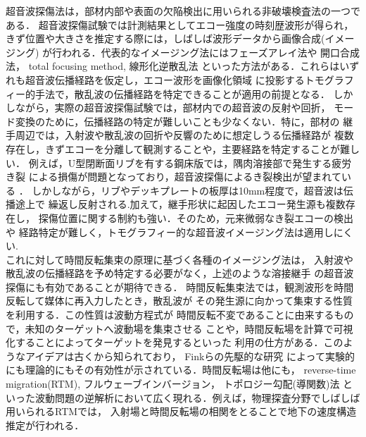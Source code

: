 ﻿超音波探傷法は，部材内部や表面の欠陥検出に用いられる非破壊検査法の一つである．
超音波探傷試験では計測結果としてエコー強度の時刻歴波形が得られ，
きず位置や大きさを推定する際には，しばしば波形データから画像合成(イメージング)
が行われる．代表的なイメージング法にはフェーズアレイ法\cite{Wilcox2007}や
開口合成法\cite{Thomson1984, Doctor1986,Langenberg1986, Schmitz2000,Spies2012}，
total focusing method\cite{Holmes2008, Zhang2010}, 
線形化逆散乱法\cite{Langenberg1989, Kitahara2002, Shlivinski2007}
といった方法がある．これらはいずれも超音波伝播経路を仮定し，エコー波形を画像化領域
に投影するトモグラフィー的手法で，散乱波の伝播経路を特定できることが適用の前提となる．
%
しかしながら，実際の超音波探傷試験では，部材内での超音波の反射や回折，
モード変換のために，伝播経路の特定が難しいことも少なくない．特に，部材の
継手周辺では，入射波や散乱波の回折や反響のために想定しうる伝播経路が
複数存在し，きずエコーを分離して観測することや，主要経路を特定することが難しい．
例えば，U型閉断面リブを有する鋼床版では，隅肉溶接部で発生する疲労き裂
による損傷が問題となっており，超音波探傷によるき裂検出が望まれている
\cite{Urib3}．
しかしながら，リブやデッキプレートの板厚は10mm程度で，超音波は伝播途上で
繰返し反射される.加えて，継手形状に起因したエコー発生源も複数存在し，
探傷位置に関する制約も強い．そのため，元来微弱なき裂エコーの検出や
経路特定が難しく，トモグラフィー的な超音波イメージング法は適用しにくい.
\\
\hspace{\parindent}
これに対して時間反転集束の原理に基づく各種のイメージング法\cite{FinkTextBook}は，
入射波や散乱波の伝播経路を予め特定する必要がなく，上述のような溶接継手
の超音波探傷にも有効であることが期待できる．
時間反転集束法では，観測波形を時間反転して媒体に再入力したとき，散乱波が
その発生源に向かって集束する性質を利用する．この性質は波動方程式が
時間反転不変であることに由来するもので，未知のターゲットへ波動場を集束させる
ことや，時間反転場を計算で可視化することによってターゲットを発見するといった
利用の仕方がある．このようなアイデアは古くから知られており，
Finkらの先駆的な研究\cite{Fink1992, Prada1994, Prada1995, Prada1995_2,  Mordant1999}
によって実験的にも理論的にもその有効性が示されている．時間反転場は他にも，
reverse-time migration(RTM)\cite{Yan2008, Etgen2009, Velichko2010, Chung2012, Jones,KK_RTM}, 
フルウェーブインバージョン\cite{Fichtner, Talantola1984}，
トポロジー勾配(導関数)法\cite{Dominguez2005, Dominguez2010, Gibiat2010, Bonnet2008, Saitoh2021}
といった波動問題の逆解析において広く現れる．例えば，物理探査分野でしばしば用いられるRTMでは，
入射場と時間反転場の相関をとることで地下の速度構造推定が行われる． 
